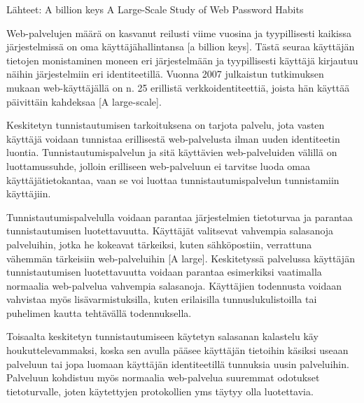 Lähteet: A billion keys
A Large-Scale Study of Web Password Habits

Web-palvelujen määrä on kasvanut reilusti viime vuosina ja tyypillisesti kaikissa järjestelmissä on oma käyttäjähallintansa [a billion keys]. Tästä seuraa käyttäjän tietojen monistaminen moneen eri järjestelmään ja tyypillisesti käyttäjä kirjautuu näihin järjestelmiin eri identiteetillä. Vuonna 2007 julkaistun tutkimuksen mukaan web-käyttäjällä on n. 25 erillistä verkkoidentiteettiä, joista hän käyttää päivittäin kahdeksaa [A large-scale].

Keskitetyn tunnistautumisen tarkoituksena on tarjota palvelu, jota vasten käyttäjä voidaan tunnistaa erillisestä web-palvelusta ilman uuden identiteetin luontia. Tunnistautumispalvelun ja sitä käyttävien web-palveluiden välillä on luottamussuhde, jolloin erilliseen web-palveluun ei tarvitse luoda omaa käyttäjätietokantaa, vaan se voi luottaa tunnistautumispalvelun tunnistamiin käyttäjiin. 

Tunnistautumispalvelulla voidaan parantaa järjestelmien tietoturvaa ja parantaa tunnistautumisen luotettavuutta. Käyttäjät valitsevat vahvempia salasanoja palveluihin, jotka he kokeavat tärkeiksi, kuten sähköpostiin, verrattuna vähemmän tärkeisiin web-palveluihin [A large]. Keskitetyssä palvelussa käyttäjän tunnistautumisen luotettavuutta voidaan parantaa esimerkiksi vaatimalla normaalia web-palvelua vahvempia salasanoja. Käyttäjien todennusta voidaan vahvistaa myös lisävarmistuksilla, kuten erilaisilla tunnuslukulistoilla tai puhelimen kautta tehtävällä todennuksella. 

Toisaalta keskitetyn tunnistautumiseen käytetyn salasanan kalastelu käy houkuttelevammaksi, koska sen avulla pääsee käyttäjän tietoihin käsiksi useaan palveluun tai jopa luomaan käyttäjän identiteetillä tunnuksia uusin palveluihin. Palveluun kohdistuu myös normaalia web-palvelua suuremmat odotukset tietoturvalle, joten käytettyjen protokollien yms täytyy olla luotettavia.
